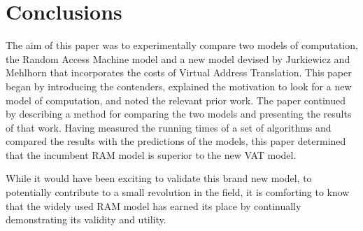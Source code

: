 \section{Conclusions}
The aim of this paper was to experimentally compare two models of computation,
the Random Access Machine model and a new model devised by Jurkiewicz and
Mehlhorn that incorporates the costs of Virtual Address Translation. This paper
began by introducing the contenders, explained the motivation to look for a new
model of computation, and noted the relevant prior work. The paper continued by
describing a method for comparing the two models and presenting the results of
that work. Having measured the running times of a set of algorithms and
compared the results with the predictions of the models, this paper determined
that the incumbent RAM model is superior to the new VAT model.

While it would have been exciting to validate this brand new model, to
potentially contribute to a small revolution in the field, it is comforting to
know that the widely used RAM model has earned its place by
continually demonstrating its validity and utility.
